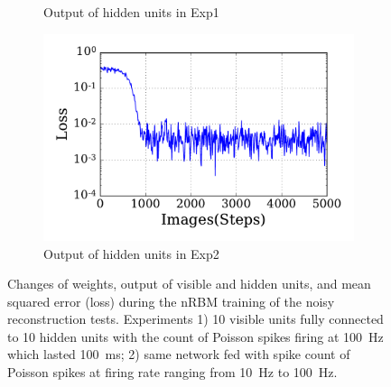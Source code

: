 \begin{figure}
\begin{subfigure}[t]{0.45\textwidth}
		\caption{Output of hidden units in Exp1}
	\end{subfigure}
	\begin{subfigure}[t]{0.45\textwidth}
		\includegraphics[width=\textwidth]{pics_sdlm/31_exp_RBM_noise/exp2_loss_s.pdf}
		\caption{Output of hidden units in Exp2}
	\end{subfigure}
	\caption{Changes of weights, output of visible and hidden units, and mean squared error (loss) during the nRBM training of the noisy reconstruction tests. 
		Experiments 1) 10 visible units fully connected to 10 hidden units with the count of Poisson spikes firing at 100~Hz which lasted 100~ms; 2) \DIFaddbeginFL {}\DIFaddendFL same network fed with spike count of Poisson spikes at firing rate ranging from 10~Hz to 100~Hz.}
	\label{fig:rbm_noise}
\end{figure}

